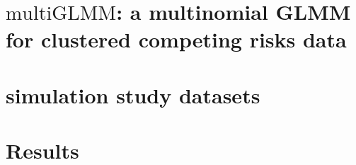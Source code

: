 \documentclass[12pt, %
               openright, %
               oneside, %
               a4paper, %
               chapter=TITLE, %
               section=TITLE, %
               brazil,
               english %
]{abntex2}
\begin{document}
\chapter{\(\text{multiGLMM}\): a multinomial GLMM for clustered
  competing risks data}
\label{cap:model}

\chapter{simulation study datasets}
\label{cap:datasets}

\chapter{Results}
\label{cap:results}

\end{document}

